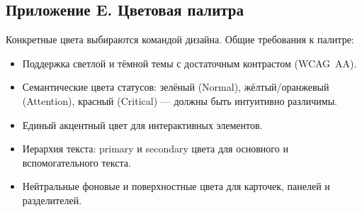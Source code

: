 \documentclass[12pt,a4paper]{article}
\begin{document}
\subsection*{Приложение E. Цветовая палитра}

Конкретные цвета выбираются командой дизайна. Общие требования к палитре:

\begin{itemize}[nosep]
  \item Поддержка светлой и тёмной темы с достаточным контрастом (WCAG~AA).
  \item Семантические цвета статусов: зелёный (Normal), жёлтый/оранжевый (Attention), красный (Critical) --- должны быть интуитивно различимы.
  \item Единый акцентный цвет для интерактивных элементов.
  \item Иерархия текста: primary и secondary цвета для основного и вспомогательного текста.
  \item Нейтральные фоновые и поверхностные цвета для карточек, панелей и разделителей.
\end{itemize}
\end{document}
